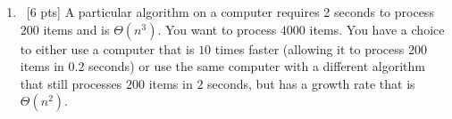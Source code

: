\documentclass[12pt]{article}
\newenvironment{sol}[1][Solution]{\begin{trivlist}\item[\hskip\labelsep {\bfseries #1:}]}{\end{trivlist}}
\begin{document}
\begin{enumerate}
    \item \ [6 pts] A particular algorithm on a computer requires 2 seconds to process $200$ items and is $\Theta(n^3)$. You want to process $4000$ items. You have a choice to either use a computer that is $10$ times faster (allowing it to process $200$ items in $0.2$ seconds) or use the same computer with a different algorithm that still processes $200$ items in $2$ seconds, but has a growth rate that is $\Theta(n^2)$.

\end{enumerate}
\end{document}

